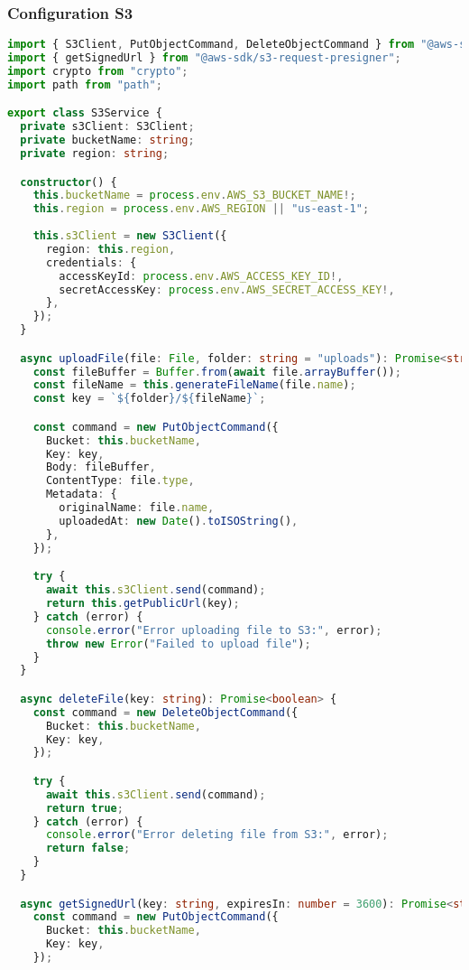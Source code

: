 \subsubsection{Configuration S3}

\begin{lstlisting}[language=TypeScript, caption=Configuration S3 Client]
import { S3Client, PutObjectCommand, DeleteObjectCommand } from "@aws-sdk/client-s3";
import { getSignedUrl } from "@aws-sdk/s3-request-presigner";
import crypto from "crypto";
import path from "path";

export class S3Service {
  private s3Client: S3Client;
  private bucketName: string;
  private region: string;

  constructor() {
    this.bucketName = process.env.AWS_S3_BUCKET_NAME!;
    this.region = process.env.AWS_REGION || "us-east-1";
    
    this.s3Client = new S3Client({
      region: this.region,
      credentials: {
        accessKeyId: process.env.AWS_ACCESS_KEY_ID!,
        secretAccessKey: process.env.AWS_SECRET_ACCESS_KEY!,
      },
    });
  }

  async uploadFile(file: File, folder: string = "uploads"): Promise<string> {
    const fileBuffer = Buffer.from(await file.arrayBuffer());
    const fileName = this.generateFileName(file.name);
    const key = `${folder}/${fileName}`;

    const command = new PutObjectCommand({
      Bucket: this.bucketName,
      Key: key,
      Body: fileBuffer,
      ContentType: file.type,
      Metadata: {
        originalName: file.name,
        uploadedAt: new Date().toISOString(),
      },
    });

    try {
      await this.s3Client.send(command);
      return this.getPublicUrl(key);
    } catch (error) {
      console.error("Error uploading file to S3:", error);
      throw new Error("Failed to upload file");
    }
  }

  async deleteFile(key: string): Promise<boolean> {
    const command = new DeleteObjectCommand({
      Bucket: this.bucketName,
      Key: key,
    });

    try {
      await this.s3Client.send(command);
      return true;
    } catch (error) {
      console.error("Error deleting file from S3:", error);
      return false;
    }
  }

  async getSignedUrl(key: string, expiresIn: number = 3600): Promise<string> {
    const command = new PutObjectCommand({
      Bucket: this.bucketName,
      Key: key,
    });


\end{lstlisting}
